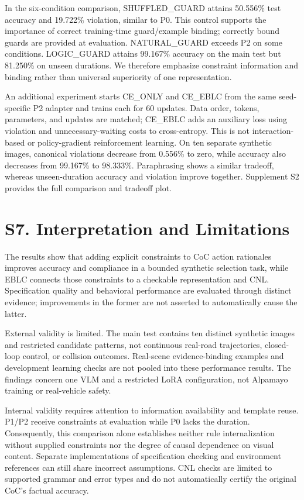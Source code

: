 \documentclass[11pt,a4paper]{article}
\begin{document}
In the six-condition comparison, SHUFFLED\_GUARD attains 50.556\% test accuracy and 19.722\% violation, similar to P0. This control supports the importance of correct training-time guard/example binding; correctly bound guards are provided at evaluation. NATURAL\_GUARD exceeds P2 on some conditions. LOGIC\_GUARD attains 99.167\% accuracy on the main test but 81.250\% on unseen durations. We therefore emphasize constraint information and binding rather than universal superiority of one representation.\par

An additional experiment starts CE\_ONLY and CE\_EBLC from the same seed-specific P2 adapter and trains each for 60 updates. Data order, tokens, parameters, and updates are matched; CE\_EBLC adds an auxiliary loss using violation and unnecessary-waiting costs to cross-entropy. This is not interaction-based or policy-gradient reinforcement learning. On ten separate synthetic images, canonical violations decrease from 0.556\% to zero, while accuracy also decreases from 99.167\% to 98.333\%. Paraphrasing shows a similar tradeoff, whereas unseen-duration accuracy and violation improve together. Supplement S2 provides the full comparison and tradeoff plot.\par

\section*{S7. Interpretation and Limitations}

The results show that adding explicit constraints to CoC action rationales improves accuracy and compliance in a bounded synthetic selection task, while EBLC connects those constraints to a checkable representation and CNL. Specification quality and behavioral performance are evaluated through distinct evidence; improvements in the former are not asserted to automatically cause the latter.\par

External validity is limited. The main test contains ten distinct synthetic images and restricted candidate patterns, not continuous real-road trajectories, closed-loop control, or collision outcomes. Real-scene evidence-binding examples and development learning checks are not pooled into these performance results. The findings concern one VLM and a restricted LoRA configuration, not Alpamayo training or real-vehicle safety.\par

Internal validity requires attention to information availability and template reuse. P1/P2 receive constraints at evaluation while P0 lacks the duration. Consequently, this comparison alone establishes neither rule internalization without supplied constraints nor the degree of causal dependence on visual content. Separate implementations of specification checking and environment references can still share incorrect assumptions. CNL checks are limited to supported grammar and error types and do not automatically certify the original CoC's factual accuracy.\par
\end{document}
